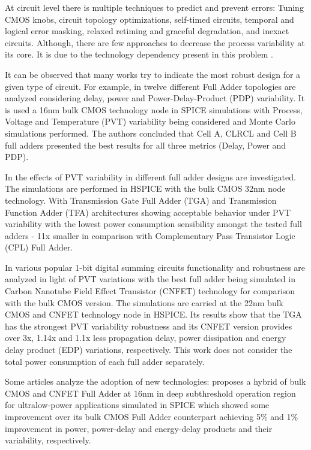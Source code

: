\documentclass[ecp,tc, english]{iiufrgs}
\begin{document}
At circuit level there is multiple techniques to predict and prevent errors: Tuning CMOS knobs, circuit topology optimizations, self-timed circuits, temporal and logical error masking, relaxed retiming and graceful degradation, and inexact circuits. Although, there are few approaches to decrease the process variability at its core. It is due to the technology dependency present in this problem \cite{rahimi2016variability}.

It can be observed that many works try to indicate the most robust design for a given type of circuit. For example, in \cite{dokania2013investigation} twelve different Full Adder topologies are analyzed considering delay, power and Power-Delay-Product (PDP) variability. It is used a 16nm bulk CMOS technology node in SPICE simulations with Process, Voltage and Temperature (PVT) variability being considered and Monte Carlo simulations performed. The authors concluded that Cell A, CLRCL and Cell B full adders presented the best results for all three metrics (Delay, Power and PDP).

In \cite{ames2016investigating} the effects of PVT variability in different full adder designs are investigated. The simulations are performed in HSPICE with the bulk CMOS 32nm node technology. With Transmission Gate Full Adder (TGA) and Transmission Function Adder (TFA) architectures showing acceptable behavior under PVT variability with the lowest power consumption sensibility amongst the tested full adders - 11x smaller in comparison with Complementary Pass Transistor Logic (CPL) Full Adder.

In \cite{islam2011design} various popular 1-bit digital summing circuits functionality and robustness are analyzed in light of PVT variations with the best full adder being simulated in Carbon Nanotube Field Effect Transistor (CNFET) technology for comparison with the bulk CMOS version. The simulations are carried at the 22nm bulk CMOS and CNFET technology node in HSPICE. Its results show that the TGA has the strongest PVT variability robustness and its CNFET version provides over 3x, 1.14x and 1.1x less propagation delay, power dissipation and energy delay product (EDP) variations, respectively. This work does not consider the total power consumption of each full adder separately.

Some articles analyze the adoption of new technologies: \cite{guduri2015design} proposes a hybrid of bulk CMOS and CNFET Full Adder at 16nm in deep subthreshold operation region for ultralow-power applications simulated in SPICE which showed some improvement over its bulk CMOS Full Adder counterpart achieving 5\% and 1\% improvement in power, power-delay and energy-delay products and their variability, respectively.  
\end{document}
